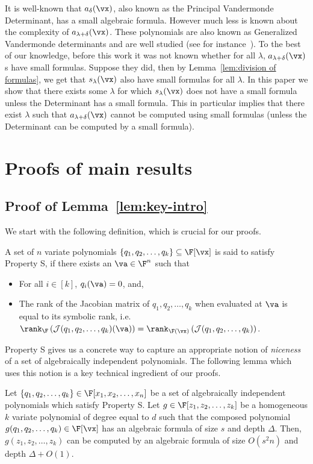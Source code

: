 It is well-known that $a_\delta(\vx)$, also known as the Principal Vandermonde Determinant, has a small algebraic formula. 
However much less is known about the complexity of $a_{\lambda+\delta}(\vx)$. These polynomials are also known as Generalized Vandermonde determinants and are well studied (see for instance~\cite{r18}). %
To the best of our knowledge, before this work it was not known whether for all $\lambda$, $a_{\lambda+\delta}(\vx)$s  have small formulas. Suppose they did, then by Lemma~\ref{lem:division of formulas}, we get that $s_\lambda(\vx)$ also have small formulas for all $\lambda$. 
In this paper we show that there exists some $\lambda$ for which $s_\lambda(\vx)$ does not have a small formula unless the Determinant has a small formula. This in particular implies that there exist $\lambda$ such that  $a_{\lambda+\delta}(\vx)$ cannot be computed using small formulas (unless the Determinant can be computed by a small formula).

%
%
%
%
%

\section{Proofs of main results}
\subsection{Proof of Lemma~\ref{lem:key-intro}}\label{sec:key lemma}
We start with the following definition, which is crucial for our proofs. 
\begin{definition}[Property S]\label{def:prop s}
A set of $n$ variate polynomials $\{q_1, q_2, \ldots, q_k\} \subseteq \F[\vx]$ is said to satisfy Property S, if there exists an $\va \in \F^n$ such that
\begin{itemize}
\item For all $i \in [k]$, $q_i(\va) = 0$, and,
\item The rank of the Jacobian matrix of $q_1, q_2, \ldots, q_k$ when evaluated at $\va$ is equal to its symbolic rank, i.e. ${\rank}_{\F}\left({\cal J}(q_1, q_2, \ldots, q_k)(\va)\right) = \rank_{\F(\vx)}\left({\cal J}(q_1, q_2, \ldots, q_k)\right)$.
\end{itemize} 
\end{definition}
Property S gives us a concrete way to capture an appropriate notion of \emph{niceness} of a set of algebraically independent polynomials. The following lemma which uses this notion is a key technical ingredient of our proofs. 
\begin{lemma}\label{lem:key}
Let $\{q_1, q_2, \ldots, q_k\} \in \F[x_1, x_2, \ldots, x_n]$ be a set of algebraically independent polynomials which satisfy Property S. Let $g \in \F[z_1, z_2, \ldots, z_k]$ be a homogeneous $k$ variate polynomial of degree equal to $d$ such that the composed polynomial $g(q_1, q_2, \ldots, q_k) \in \F[\vx]$ has an algebraic formula of size $s$ and depth $\Delta$. Then, $g(z_1, z_2, \ldots, z_k)$ can be computed by an algebraic formula of size $O(s^2n)$ and depth $\Delta+O(1)$.  
\end{lemma}

